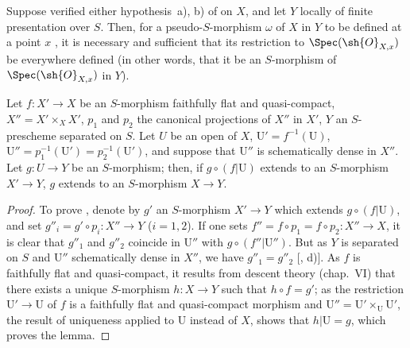 \begin{corollary}[20.3.9]
\label{IV.20.3.9}
Suppose verified either hypothesis~a), b) of  on $X$, and let $Y$ locally of finite presentation over $S$.
Then, for a pseudo-$S$-morphism $\omega$ of $X$ in $Y$ to be defined at a point $x$ , it is necessary and sufficient that its restriction to $\Spec(\sh{O}_{X,x})$ be everywhere defined (in other words, that it be an $S$-morphism of $\Spec(\sh{O}_{X,x})$ in $Y$).
\end{corollary}

\begin{lemma}[20.3.10]
\label{IV.20.3.10}
Let $f:X'\to X$ be an $S$-morphism faithfully flat and quasi-compact, $X''=X'\times_X X'$, $p_1$ and $p_2$ the canonical projections of $X''$ in $X'$, $Y$ an $S$-prescheme separated on $S$.
Let $U$ be an open of $X$, $\mathrm{U}'=f^{-1}(\mathrm{U})$, $\mathrm{U}''=p_1^{-1}(\mathrm{U}')=p_2^{-1}(\mathrm{U}')$, and suppose that $\mathrm{U}''$ is schematically dense in $X''$.
Let $g:U\to Y$ be an $S$-morphism;
then, if $g\circ(f|\mathrm{U})$ extends to an $S$-morphism $X'\to Y$, $g$ extends to an $S$-morphism $X\to Y$.
\end{lemma}

\begin{proof}
To prove , denote by $g'$ an $S$-morphism $X'\to Y$ which extends $g\circ(f|\mathrm{U})$, and set $g''_i=g'\circ p_i:X''\to Y$ ($i=1,2$).
If one sets $f''=f\circ p_1=f\circ p_2:X''\to X$, it is clear that $g''_1$ and $g''_2$ coincide in $\mathrm{U}''$ with $g\circ(f''|\mathrm{U}'')$.
But as $Y$ is separated on $S$ and $\mathrm{U}''$ schematically dense in $X''$, we have $g''_1=g''_2$ [, d)].
As $f$ is faithfully flat and quasi-compact, it results from descent theory (chap.~VI) that there exists a unique $S$-morphism $h:X\to Y$ such that $h\circ f=g'$;
as the restriction $\mathrm{U}'\to\mathrm{U}$ of $f$ is a faithfully flat and quasi-compact morphism and $\mathrm{U}''=\mathrm{U}'\times_\mathrm{U}\mathrm{U}'$, the result of uniqueness applied to $\mathrm{U}$ instead of $X$, shows that $h|\mathrm{U}=g$, which proves the lemma.
\end{proof}

